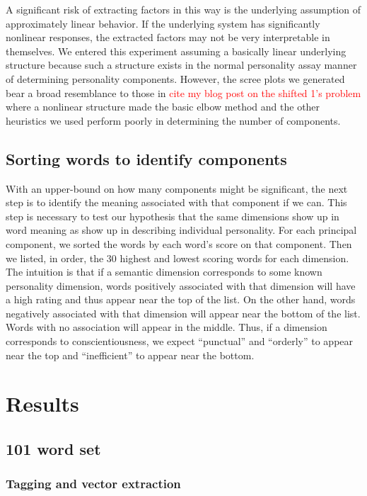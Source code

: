\documentclass[10pt,letterpaper]{book}
\newcommand{\todo}[1]{\textcolor{red}{#1}}
\begin{document}
A significant risk of extracting factors in this way is the underlying assumption of approximately linear behavior. If the underlying system has significantly nonlinear responses, the extracted factors may not be very interpretable in themselves. We entered this experiment assuming a basically linear underlying structure because such a structure exists in the normal personality assay manner of determining personality components. However, the scree plots we generated bear a broad resemblance to those in \todo{cite my blog post on the shifted 1's problem} where a nonlinear structure made the basic elbow method and the other heuristics we used perform poorly in determining the number of components.

\section{Sorting words to identify components}

With an upper-bound on how many components might be significant, the next 
step is to identify the meaning associated with that component if we can. This 
step is necessary to test our hypothesis that the same dimensions show up in 
word meaning as show up in describing individual personality. For each principal 
component, we sorted the words by each word's score on that component. Then we 
listed, in order, the 30 highest and lowest scoring words for each dimension. 
The intuition is that if a semantic dimension corresponds to some known 
personality dimension, words positively associated with that dimension will have 
a high rating and thus appear near the top of the list. On the other hand, words 
negatively associated with that dimension will appear near the bottom of the 
list. Words with no association will appear in the middle. Thus, if a dimension 
corresponds to conscientiousness, we expect ``punctual'' and ``orderly'' to 
appear near the top and ``inefficient'' to appear near the bottom.

\chapter{Results}

\section{101 word set}

\subsection{Tagging and vector extraction}
\end{document}
